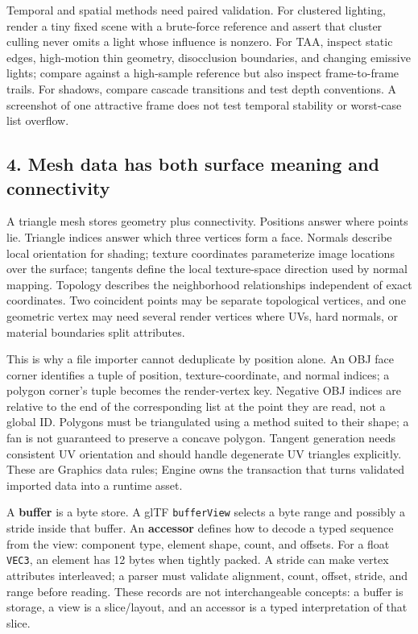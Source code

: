 Temporal and spatial methods need paired validation. For clustered lighting, render a tiny fixed scene with a brute-force reference and assert that cluster culling never omits a light whose influence is nonzero. For TAA, inspect static edges, high-motion thin geometry, disocclusion boundaries, and changing emissive lights; compare against a high-sample reference but also inspect frame-to-frame trails. For shadows, compare cascade transitions and test depth conventions. A screenshot of one attractive frame does not test temporal stability or worst-case list overflow.

\subsection{4. Mesh data has both surface meaning and connectivity}\label{04-visual-computing-ii-ch037-mesh-data-has-both-surface-meaning-and-connectivity}

\hypertarget{04-visual-computing-ii-ch037-mesh-data-has-both-surface-meaning-and-connectivity}{}

A triangle mesh stores geometry plus connectivity. Positions answer where points lie. Triangle indices answer which three vertices form a face. Normals describe local orientation for shading; texture coordinates parameterize image locations over the surface; tangents define the local texture-space direction used by normal mapping. Topology describes the neighborhood relationships independent of exact coordinates. Two coincident points may be separate topological vertices, and one geometric vertex may need several render vertices where UVs, hard normals, or material boundaries split attributes.

This is why a file importer cannot deduplicate by position alone. An OBJ face corner identifies a tuple of position, texture-coordinate, and normal indices; a polygon corner's tuple becomes the render-vertex key. Negative OBJ indices are relative to the end of the corresponding list at the point they are read, not a global ID. Polygons must be triangulated using a method suited to their shape; a fan is not guaranteed to preserve a concave polygon. Tangent generation needs consistent UV orientation and should handle degenerate UV triangles explicitly. These are Graphics data rules; Engine owns the transaction that turns validated imported data into a runtime asset.

A \textbf{buffer} is a byte store. A glTF \texttt{bufferView} selects a byte range and possibly a stride inside that buffer. An \textbf{accessor} defines how to decode a typed sequence from the view: component type, element shape, count, and offsets. For a float \texttt{VEC3}, an element has 12 bytes when tightly packed. A stride can make vertex attributes interleaved; a parser must validate alignment, count, offset, stride, and range before reading. These records are not interchangeable concepts: a buffer is storage, a view is a slice/layout, and an accessor is a typed interpretation of that slice.

